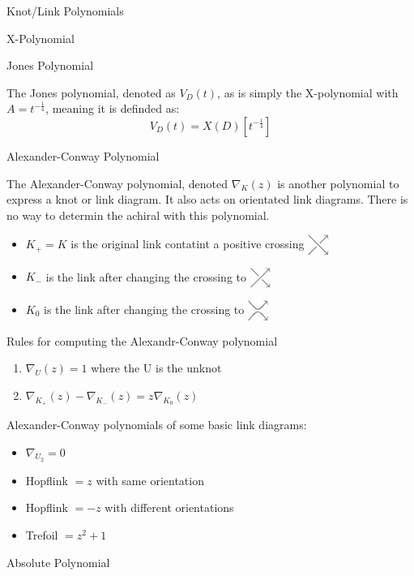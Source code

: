 \documentclass[12pt, letterpaper]{article}
\newcommand{\KP}[1]{%
  \begin{tikzpicture}[baseline=-\dimexpr\fontdimen22\textfont2\relax]
  #1
  \end{tikzpicture}%
}
\newcommand{\DPCross}{%
  \KP{
    \draw[color=gray,thick,->] (-0.3,0.3) -- (0.3,-0.3);
    \draw[color=gray,thick] (-0.3,-0.3) -- (-0.05,-0.05);
    \draw[color=gray,thick,->] (0.05,0.05) -- (0.3,0.3);
  }%
}
\newcommand{\DNCross}{%
  \KP{
    \draw[color=gray,thick] (-0.3,0.3) -- (-0.05,0.05);
    \draw[color=gray,thick,->] (0.05,-0.05) -- (0.3,-0.3);
    \draw[color=gray,thick,->] (-0.3,-0.3) -- (0.3,0.3);
  }%
}
\newcommand{\DSmooth}{%
  \KP{%
    \draw[color=gray,thick,->] (-0.3,0.3)..controls (0,-0.05).. (0.3,0.3);
    \draw[color=gray,thick,->] (-0.3,-0.3)..controls (0,0.05).. (0.3,-0.3);
  }%
}
\begin{document}
\begin{section}{Knot/Link Polynomials}
\begin{subsection}{X-Polynomial}
  \end{subsection}

  \begin{subsection}{Jones Polynomial}

    The Jones polynomial, denoted as \(V_{D}(t)\), as is simply the X-polynomial
    with \(A = t^{-\frac{1}{4}}\), meaning it is definded as:
    \[V_{D}(t) = X(D)[t^{-\frac{1}{4}}]\]

  \end{subsection}

  \begin{subsection}{Alexander-Conway Polynomial}

    The Alexander-Conway polynomial, denoted \(\nabla_{K}(z)\)
    is another polynomial to express a knot or link diagram. It also acts on
    orientated link diagrams.
    There is no way to determin the achiral with this polynomial.

    \begin{itemize}
      \item \(K_{+} = K\) is the original link contatint a positive crossing
            \(\DPCross\)
      \item \(K_{-}\) is the link after changing the crossing to \(\DNCross\)
      \item \(K_{0}\) is the link after changing the crossing to \(\DSmooth\)
    \end{itemize}

    Rules for computing the Alexandr-Conway polynomial
    \begin{enumerate}
      \item \(\nabla_{U}(z) = 1\) where the U is the unknot
      \item \(\nabla_{K_{+}}(z) - \nabla_{K_{-}}(z) = z\nabla_{K_{0}}(z)\)
    \end{enumerate}

    Alexander-Conway polynomials of some basic link diagrams:
    \begin{itemize}
      \item \(\nabla_{U_{2}} = 0\)
      \item Hopflink \(= z\) with same orientation
      \item Hopflink \(= -z\) with different orientations
      \item Trefoil \(= z^{2} + 1\)
    \end{itemize}

  \end{subsection}

  \begin{subsection}{Absolute Polynomial}


\end{subsection}
\end{section}
\end{document}

